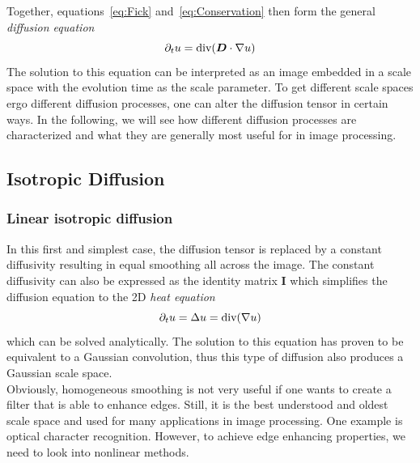 Together, equations~\eqref{eq:Fick} and~\eqref{eq:Conservation} then form the general \textit{diffusion
    equation}~\cite{dic, weickert96}
\begin{equation}
    \partial_t u = \textnormal{div}(\boldsymbol D\cdot\mathbf{\nabla} u)\label{eq:Diffusion}
\end{equation}
The solution to this equation can be interpreted as an image embedded in a scale space with the
evolution time as the scale parameter. To get different scale spaces ergo different diffusion
processes, one can alter the diffusion tensor in certain ways.
In the following, we will see how different diffusion processes are characterized and what they are
generally most useful for in image processing.

\subsection{Isotropic Diffusion}
\subsubsection*{Linear isotropic diffusion}
In this first and simplest case, the diffusion tensor is replaced by a constant diffusivity
resulting in equal smoothing all across the image. The constant diffusivity can also be expressed
as the identity matrix $\boldsymbol I$ which simplifies the diffusion equation to the 2D\textit{
heat equation}
\begin{equation}
    \partial_t u = \Delta u = \textnormal{div}(\mathbf{\nabla} u)\label{eq:IsoDiff}
\end{equation}
which can be solved analytically. The solution to this equation has proven to be equivalent to
a Gaussian convolution, thus this type of diffusion also produces a Gaussian scale space.\\
Obviously, homogeneous smoothing is not very useful if one wants to create a filter that is able to
enhance edges. Still, it is the best understood and oldest scale space and used for many
applications in image processing. One example is optical character recognition.
However, to achieve edge enhancing properties, we need to look into nonlinear methods.

